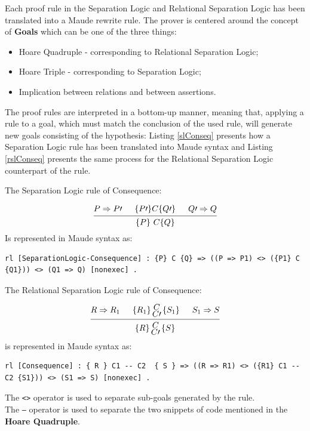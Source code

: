 \documentclass[12pt,a4paper]{article}
\newcommand{\hq}[4]{
	\left\{{#1}\right\}
	\let\scriptstyle\textstyle 
	\substack{{#2} \\ 	\let\scriptstyle\textstyle {#3}} 
	\left\{{#4}\right\}
}
\begin{document}
Each proof rule in the Separation Logic and Relational Separation Logic has been translated into a Maude rewrite rule. The prover is centered around the concept of \textbf{Goals} which can be one of the three things: 
\begin{itemize}
	\item {Hoare Quadruple} - corresponding to Relational Separation Logic;
	\item {Hoare Triple} - corresponding to Separation Logic;
	\item {Implication between relations and between assertions}.
\end{itemize} 
The proof rules are interpreted in a bottom-up manner, meaning that, applying a rule to a goal, which must match the conclusion of the used rule, will generate new goals consisting of the hypothesis: Listing \ref{slConseq} presents how a Separation Logic rule has been translated into Maude syntax and Listing \ref{rslConseq} presents the same process for the Relational Separation Logic counterpart of the rule.
\begin{flushleft}
	The Separation Logic rule of \textsf{Consequence}:
\end{flushleft}
	\medskip
	\[
	\begin{prooftree}
	\Hypo{P \Rightarrow P\prime}
	\Hypo{\{P\prime\} C \{Q\prime\}}
	\Hypo{Q\prime \Rightarrow Q}
	\Infer 3 {\{P\}\  C  \{Q\}}
	\end{prooftree}	
	\]
	Is represented in Maude syntax as: 
\begin{lstlisting}[caption=Separation Logic Consequence rule,label=slConseq]
	rl [SeparationLogic-Consequence] : {P} C {Q} => ((P => P1) <> ({P1} C {Q1})) <> (Q1 => Q) [nonexec] .
\end{lstlisting}
\begin{flushleft}
	The Relational Separation Logic rule of \textsf{Consequence}:
\end{flushleft}
	\[
	\begin{prooftree}
	\Hypo{R \Rightarrow R_1}
	\Hypo{\hq{R_1}{C}{C\prime}{S_1}}
	\Hypo{S_1 \Rightarrow S}
	\Infer 3 {\hq{R}{C}{C\prime}{S}}
	\end{prooftree}	
	\]
	is represented in Maude syntax as: 
	\begin{lstlisting}[caption=Relational Separation Logic Consequence rule,label=rslConseq]
	rl [Consequence] : { R } C1 -- C2  { S } => ((R => R1) <> ({R1} C1 -- C2 {S1})) <> (S1 => S) [nonexec] .
	\end{lstlisting}
The \texttt{<>} operator is used to separate sub-goals generated by the rule.
\\
The \texttt{---} operator is used to separate the two snippets of code mentioned in the \textbf{Hoare Quadruple}.
\\
\end{document}
